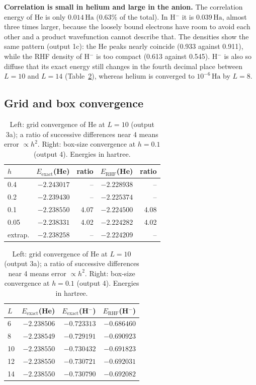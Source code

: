 \documentclass[11pt,a4paper]{article}
\newcommand{\Ha}{\ensuremath{\,\mathrm{Ha}}}
\begin{document}
\begin{insight}
\textbf{Correlation is small in helium and large in the anion.} The correlation energy of He is only
$0.014$\Ha{} (0.63\% of the total). In H$^-$ it is $0.039$\Ha, almost three times larger, because the loosely bound
electrons have room to avoid each other and a product wavefunction cannot describe that. The densities show the
same pattern (output 1c): the He peaks nearly coincide (0.933 against 0.911), while the RHF density of H$^-$ is too compact
(0.613 against 0.545). H$^-$ is also so diffuse that its exact energy still changes in the fourth decimal place between
$L=10$ and $L=14$ (Table~\ref{tab:conv}), whereas helium is converged to $10^{-6}$\Ha{} by $L=8$.
\end{insight}

\subsection{Grid and box convergence}

\begin{table}[H]
\centering\small
\begin{tabular}{lrrrr}
\toprule
$h$ & $E_\text{exact}$(He) & ratio & $E_\text{RHF}$(He) & ratio\\
\midrule
0.4          & $-2.243017$ & --   & $-2.228938$ & --\\
0.2          & $-2.239430$ & --   & $-2.225374$ & --\\
0.1          & $-2.238550$ & 4.07 & $-2.224500$ & 4.08\\
0.05         & $-2.238331$ & 4.02 & $-2.224282$ & 4.02\\
extrap.      & $-2.238258$ & --   & $-2.224209$ & --\\
\bottomrule
\end{tabular}
\hspace{1.2em}
\begin{tabular}{lrrr}
\toprule
$L$ & $E_\text{exact}$(He) & $E_\text{exact}$(H$^-$) & $E_\text{RHF}$(H$^-$)\\
\midrule
6  & $-2.238506$ & $-0.723313$ & $-0.686460$\\
8  & $-2.238549$ & $-0.729191$ & $-0.690923$\\
10 & $-2.238550$ & $-0.730432$ & $-0.691823$\\
12 & $-2.238550$ & $-0.730721$ & $-0.692031$\\
14 & $-2.238550$ & $-0.730790$ & $-0.692082$\\
\bottomrule
\end{tabular}
\caption{Left: grid convergence of He at $L=10$ (output 3a); a ratio of successive differences near 4 means
error $\propto h^2$. Right: box-size convergence at $h=0.1$ (output 4). Energies in hartree.}
\label{tab:conv}
\end{table}
\end{document}
